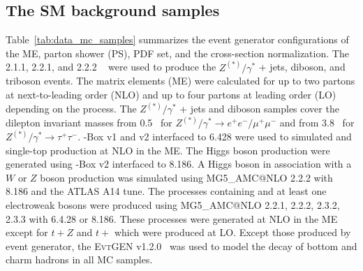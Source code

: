 \subsection{The SM background samples}
\label{subsec:data_sm_bkg_samples}
Table~\ref{tab:data_mc_samples} summarizes the event generator configurations of the ME, parton shower (PS), PDF set, and the cross-section normalization.
The {\SHERPA} 2.1.1, 2.2.1, and 2.2.2 ~\cite{Gleisberg:2008ta} were used to produce the $Z^{(*)}/\gamma^{*}$ + jets, diboson, and triboson events.
The matrix elements (ME) were calculated for up to two partons at next-to-leading order (NLO) and up to four partons at leading order (LO) depending on the process.
The $Z^{(*)}/\gamma^{*}$ + jets and diboson samples cover the dilepton invariant masses from 0.5~{\GeV} for $Z^{(*)}/\gamma^{*} \to e^{+}e^{-}/\mu^{+}\mu^{-}$ and from 3.8~{\GeV} for $Z^{(*)}/\gamma^{*} \to \tau^{+}\tau^{-}$.
{\POWHEG}-Box v1 and v2 interfaced to {\PYTHIA} 6.428 were used to simulated \ttbar and single-top production at NLO in the ME.
The Higgs boson production were generated using {\POWHEG}-Box v2 interfaced to {\PYTHIA} 8.186.
A Higgs boson in association with a $W$ or $Z$ boson production was simulated using MG5\_{\scriptsize A}MC@NLO 2.2.2 with {\PYTHIA} 8.186 and the ATLAS A14 tune.
The processes containing \ttbar and at least one electroweak bosons were produced using MG5\_{\scriptsize A}MC@NLO 2.2.1, 2.2.2, 2.3.2, 2.3.3 with {\PYTHIA} 6.4.28 or 8.186.
These processes were generated at NLO in the ME except for $t + Z$ and $t +$ \ttbar which were produced at LO.
Except those produced by {\SHERPA} event generator, the \textsc{EvtGEN}\xspace v1.2.0~\cite{Lange:2001uf} was used to model the decay of bottom and charm hadrons in all MC samples.

